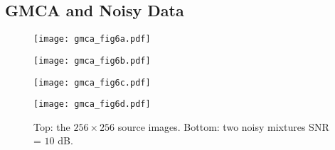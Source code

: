 




\subsection{GMCA and Noisy Data}
\begin{figure}[htb]
\begin{minipage}[b]{0.49\linewidth}
                  \centerline{         \texttt{[image: gmca\_fig6a.pdf]}}
\end{minipage}
\hfill
\begin{minipage}[b]{0.49\linewidth}
                  \centerline{         \texttt{[image: gmca\_fig6b.pdf]}}
 \end{minipage}
\vfill
\begin{minipage}[b]{0.49\linewidth}
                  \centerline{         \texttt{[image: gmca\_fig6c.pdf]}}
 \end{minipage}
\hfill
\begin{minipage}[b]{0.49\linewidth}
                  \centerline{         \texttt{[image: gmca\_fig6d.pdf]}}
\end{minipage}
 
\caption{Top: the $256 \times 256$ source images. Bottom: two noisy mixtures SNR = $10$ dB.}  
\label{fig:im_source_mixt}
\end{figure}

